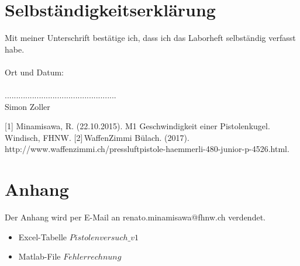 \documentclass[12pt, titlepage]{article}
\numberwithin{equation}{section} %
\begin{document}
\begin{titlepage}
	
\end{titlepage}



\tableofcontents

\newpage





\newpage

\newpage

\newpage

\newpage

\newpage


\section{Selbständigkeitserklärung}
Mit meiner Unterschrift bestätige ich, dass ich das Laborheft selbständig verfasst habe.\\\\
Ort und Datum:\\\\
.................................................\\
Simon Zoller
\newpage


\begin{thebibliography}{xxxxxxxxxxxxxxxxxxx}
   [1] Minamisawa, R. (22.10.2015). M1 Geschwindigkeit einer Pistolenkugel. 	 	   Windisch, FHNW.
   [2]\,WaffenZimmi Bülach. (2017). http://www.waffenzimmi.ch/pressluftpistole-haemmerli-480-junior-p-4526.html.
\end{thebibliography}




\listoffigures

\newpage 
\section{Anhang}
Der Anhang wird per E-Mail an renato.minamisawa@fhnw.ch verdendet.
\begin{itemize}
	\item Excel-Tabelle $Pistolenversuch\_v1$
	\item Matlab-File $Fehlerrechnung$
\end{itemize}
\end{document}

